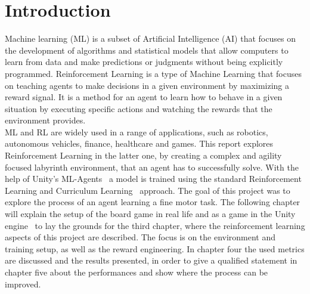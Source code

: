 
\section{Introduction}\label{sec:introduction}
Machine learning (ML) is a subset of Artificial Intelligence (AI) that focuses on the development of algorithms and statistical
models that allow computers to learn from data and make predictions or judgments without being explicitly programmed.
Reinforcement Learning is a type of Machine Learning that focuses on teaching agents to make decisions in a given environment
by maximizing a reward signal.
It is a method for an agent to learn how to behave in a given situation by executing specific
actions and watching the rewards that the environment provides.\\
ML and RL are widely used in a range of applications, such as robotics, autonomous vehicles, finance, healthcare and games.
This report explores Reinforcement Learning in the latter one, by creating a complex and agility focused labyrinth environment,
that an agent has to successfully solve.
With the help of Unity's ML-Agents~\cite{juliani2020} a model is trained using the standard Reinforcement Learning and Curriculum Learning~\cite{narvekar_learning_2018} approach.
The goal of this project was to explore the process of an agent learning a fine motor task.
The following chapter will explain the setup of the board game in real life and as a game in the Unity engine~\cite{Haas2014AHO} to lay the grounds
for the third chapter, where the reinforcement learning aspects of this project are described.
The focus is on the environment and training setup, as well as the reward engineering.
In chapter four the used metrics are discussed and the results presented, in order to give a qualified statement in chapter five
about the performances and show where the process can be improved.